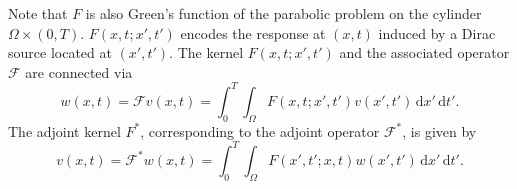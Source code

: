 \documentclass[onefignum,onetabnum]{siamart190516}
\numberwithin{equation}{section}
\begin{document}
Note that $F$ is also Green's function of the parabolic problem on the cylinder $\Omega\times(0,T)$.
$F(x,t; x',t')$ encodes the response at $(x,t)$ induced by a Dirac source located at $(x',t')$.
The kernel $F(x,t;x',t')$ and the associated operator $\mathcal{F}$ are connected via
\begin{equation*}
w(x,t) = \mathcal{F}v(x,t)  = \int_{0}^{T} \int_{\Omega} F(x,t; x',t') v(x',t') \, \mathrm{d}x' \, \mathrm{d}t'.
\end{equation*}
The adjoint kernel $F^{*}$, corresponding to the adjoint operator $\mathcal{F}^{*}$, is given by
\begin{equation*}
v (x,t)= \mathcal{F}^{*}w(x,t) = \int_{0}^{T} \int_{\Omega} F(x',t'; x,t) w(x',t') \, \mathrm{d}x' \, \mathrm{d}t'.
\end{equation*}
\end{document}
